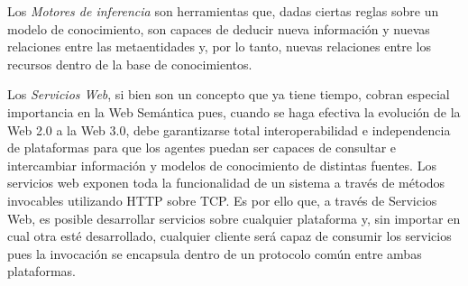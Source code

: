 Los \textit{Motores de inferencia} son herramientas que, dadas ciertas reglas sobre un modelo de conocimiento, son capaces de deducir nueva información y nuevas relaciones entre las metaentidades y, por lo tanto, nuevas relaciones entre los recursos dentro de la base de conocimientos.

Los \textit{Servicios Web}, si bien son un concepto que ya tiene tiempo, cobran especial importancia en la Web Semántica pues, cuando se haga efectiva la evolución de la Web 2.0 a la Web 3.0, debe garantizarse total interoperabilidad e independencia de plataformas para que los agentes puedan ser capaces de consultar e intercambiar información y modelos de conocimiento de distintas fuentes. Los servicios web exponen toda la funcionalidad de un sistema a través de métodos invocables utilizando HTTP sobre TCP. Es por ello que, a través de Servicios Web, es posible desarrollar servicios sobre cualquier plataforma y, sin importar en cual otra esté desarrollado, cualquier cliente será capaz de consumir los servicios pues la invocación se encapsula dentro de un protocolo común entre ambas plataformas. 

\newpage
